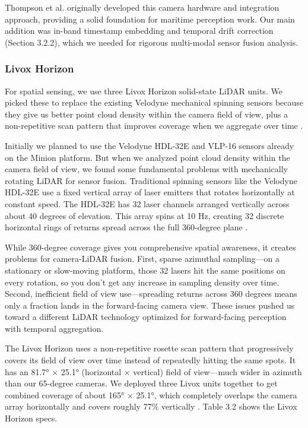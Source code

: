 \documentclass{erauthesis}
\begin{document}
Thompson et al. \cite{thompson2023} originally developed this camera hardware and integration approach, providing a solid foundation for maritime perception work.
Our main addition was in-band timestamp embedding and temporal drift correction (Section 3.2.2), which we needed for rigorous multi-modal sensor fusion analysis.

            \subsubsection{Livox Horizon}

For spatial sensing, we use three Livox Horizon solid-state \ac{LiDAR} units.
We picked these to replace the existing Velodyne mechanical spinning sensors because they give us better point cloud density within the camera field of view, plus a non-repetitive scan pattern that improves coverage when we aggregate over time \cite{thompson2023}.

Initially we planned to use the Velodyne HDL-32E and VLP-16 sensors already on the Minion platform.
But when we analyzed point cloud density within the camera field of view, we found some fundamental problems with mechanically rotating \ac{LiDAR} for sensor fusion.
Traditional spinning sensors like the Velodyne HDL-32E use a fixed vertical array of laser emitters that rotates horizontally at constant speed.
The HDL-32E has 32 laser channels arranged vertically across about 40 degrees of elevation.
This array spins at 10 Hz, creating 32 discrete horizontal rings of returns spread across the full 360-degree plane \cite{thompson2023}.

While 360-degree coverage gives you comprehensive spatial awareness, it creates problems for camera-\ac{LiDAR} fusion.
First, sparse azimuthal sampling—on a stationary or slow-moving platform, those 32 lasers hit the same positions on every rotation, so you don't get any increase in sampling density over time.
Second, inefficient field of view use—spreading returns across 360 degrees means only a fraction lands in the forward-facing camera view.
These issues pushed us toward a different \ac{LiDAR} technology optimized for forward-facing perception with temporal aggregation.

The Livox Horizon uses a non-repetitive rosette scan pattern that progressively covers its field of view over time instead of repeatedly hitting the same spots.
It has an 81.7° × 25.1° (horizontal × vertical) field of view—much wider in azimuth than our 65-degree cameras.
We deployed three Livox units together to get combined coverage of about 165° × 25.1°, which completely overlaps the camera array horizontally and covers roughly 77\% vertically \cite{thompson2023}.
Table 3.2 shows the Livox Horizon specs.
\end{document}
